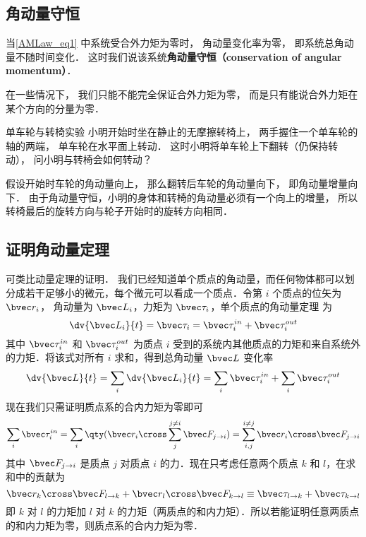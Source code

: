 \subsection{角动量守恒}
当\autoref{AMLaw_eq1} 中系统受合外力矩为零时， 角动量变化率为零， 即系统总角动量不随时间变化． 这时我们说该系统\textbf{角动量守恒（conservation of angular momentum）}．

在一些情况下， 我们只能不能完全保证合外力矩为零， 而是只有能说合外力矩在某个方向的分量为零．

\begin{example}{单车轮与转椅实验}
小明开始时坐在静止的无摩擦转椅上， 两手握住一个单车轮的轴的两端， 单车轮在水平面上转动． 这时小明将单车轮上下翻转（仍保持转动）， 问小明与转椅会如何转动？

假设开始时车轮的角动量向上， 那么翻转后车轮的角动量向下， 即角动量增量向下． 由于角动量守恒，小明的身体和转椅的角动量必须有一个向上的增量， 所以转椅最后的旋转方向与轮子开始时的旋转方向相同．
\end{example}


\subsection{证明角动量定理}
可类比动量定理的证明． 我们已经知道单个质点的角动量，而任何物体都可以划分成若干足够小的微元，每个微元可以看成一个质点．令第 $i$ 个质点的位矢为 $\bvec r_i$， 角动量为 $\bvec L_i$，力矩为 $\bvec \tau_i$，单个质点的角动量定理 为
\begin{equation}
\dv{\bvec L_i}{t} = \bvec \tau_i = \bvec \tau_i^{in} + \bvec \tau_i^{out}
\end{equation}
其中 $\bvec \tau_i^{in}$ 和 $\bvec \tau_i^{out}$ 为质点 $i$ 受到的系统内其他质点的力矩和来自系统外的力矩．将该式对所有 $i$ 求和，得到总角动量 $\bvec L$ 变化率
\begin{equation}
\dv{\bvec L}{t} =\sum_i\dv{\bvec L_i}{t} = \sum_i\bvec \tau_i^{in} + \sum_i\bvec \tau_i^{out}
\end{equation}
现在我们只需证明质点系的合内力矩为零即可
\begin{equation}
\sum_i\bvec \tau_i^{in} = \sum_i \qty(\bvec r_i\cross\sum_j^{j\ne i}\bvec F_{j\to i}) = \sum_{i,j}^{i\ne j} \bvec r_i\cross\bvec F_{j\to i}
\end{equation}
其中 $\bvec F_{j\to i}$ 是质点 $j$ 对质点 $i$ 的力．现在只考虑任意两个质点 $k$ 和 $l$，在求和中的贡献为
\begin{equation}
\bvec r_k\cross\bvec F_{l\to k} + \bvec r_l\cross\bvec F_{k\to l} \equiv \bvec \tau_{l\to k}+ \bvec \tau_{k\to l}
\end{equation}
即 $k$ 对 $l$ 的力矩加 $l$ 对 $k$ 的力矩（两质点的和内力矩）．所以若能证明任意两质点的和内力矩为零，则质点系的合内力矩为零．

